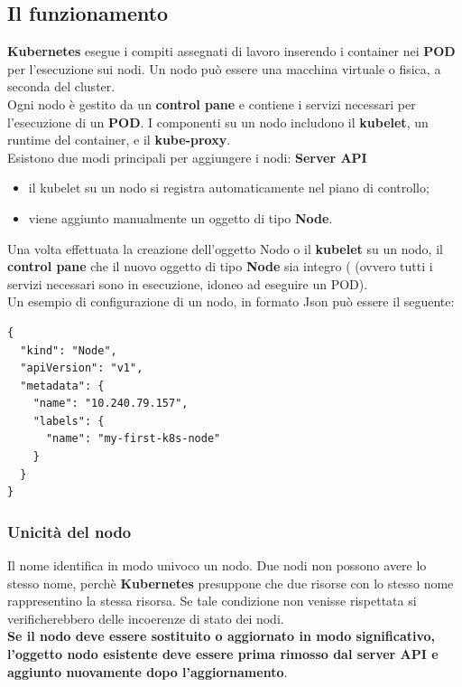 \documentclass{article}
\begin{document}
\subsection{Il funzionamento}
\textbf{Kubernetes} esegue i compiti assegnati di lavoro inserendo i container nei \textbf{POD}  per l'esecuzione sui nodi. Un nodo può essere una macchina virtuale o fisica, a seconda del cluster. \\
Ogni nodo è gestito da un \textbf{control pane} e contiene i servizi necessari per l'esecuzione di un \textbf{POD}. I componenti su un nodo includono  il \textbf{kubelet}, un runtime del container, e il \textbf{kube-proxy}.\\
Esistono due modi principali  per aggiungere i nodi: \textbf{Server API} 
\begin{itemize}
    \item il kubelet su un nodo si registra automaticamente nel piano di controllo;
    \item viene aggiunto manualmente un oggetto di tipo \textbf{Node}.
\end{itemize}
Una volta effettuata la creazione dell'oggetto Nodo o il \textbf{kubelet} su un nodo, il \textbf{control pane} che il nuovo oggetto di tipo \textbf{Node} sia integro ( (ovvero tutti i servizi necessari sono in esecuzione, idoneo ad eseguire un POD). \\
Un esempio di configurazione di un nodo, in formato Json può essere il seguente: 
\begin{lstlisting}
{
  "kind": "Node",
  "apiVersion": "v1",
  "metadata": {
    "name": "10.240.79.157",
    "labels": {
      "name": "my-first-k8s-node"
    }
  }
}
\end{lstlisting}
\subsubsection{Unicità del nodo}
Il nome identifica in modo univoco un nodo. Due nodi non possono avere lo stesso nome, perchè \textbf{Kubernetes} presuppone che due risorse con lo stesso nome rappresentino la stessa risorsa. Se tale condizione non venisse rispettata si verificherebbero delle incoerenze di stato dei nodi. \\
\textbf{Se il nodo deve essere sostituito o aggiornato in modo significativo, l'oggetto nodo esistente deve essere prima rimosso dal server API e aggiunto nuovamente dopo l'aggiornamento}.
\end{document}
